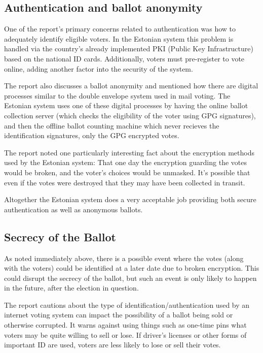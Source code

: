 \documentclass[a4paper, 11pt]{article} %
\begin{document}
\subsection*{Authentication and ballot anonymity}

One of the report's primary concerns related to authentication was how to adequately identify eligible voters. In the Estonian system this problem is handled via the country's already implemented PKI (Public Key Infrastructure) based on the national ID cards. Additionally, voters must pre-register to vote online, adding another factor into the security of the system.

The report also discusses a ballot anonymity and mentioned how there are digital processes similar to the double envelope system used in mail voting. The Estonian system uses one of these digital processes by having the online ballot collection server (which checks the eligibility of the voter using GPG signatures), and then the offline ballot counting machine which never recieves the identification signatures, only the GPG encrypted votes.

The report noted one particularly interesting fact about the encryption methods used by the Estonian system: That one day the encryption guarding the votes would be broken, and the voter's choices would be unmasked. It's possible that even if the votes were destroyed that they may have been collected in transit.

Altogether the Estonian system does a very acceptable job providing both secure authentication as well as anonymous ballots.

\subsection*{Secrecy of the Ballot}

As noted immediately above, there is a possible event where the votes (along with the voters) could be identified at a later date due to broken encryption. This could disrupt the secrecy of the ballot, but such an event is only likely to happen in the future, after the election in question.

The report cautions about the type of identification/authentication used by an internet voting system can impact the possibility of a ballot being sold or otherwise corrupted. It warns against using things such as one-time pins what voters may be quite willing to sell or lose. If driver's licenses or other forms of important ID are used, voters are less likely to lose or sell their votes.
\end{document}
